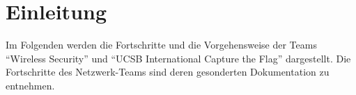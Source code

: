 \chapter{Einleitung}
Im Folgenden werden die Fortschritte und die Vorgehensweise der Teams "`Wireless Security"' und "`UCSB International Capture the Flag"' dargestellt. Die Fortschritte des Netzwerk-Teams sind deren gesonderten Dokumentation zu entnehmen.